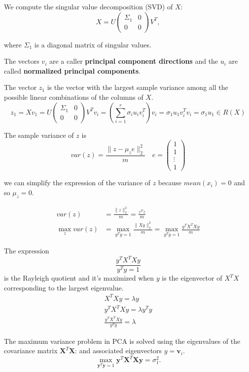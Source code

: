 We compute the singular value decomposition (SVD) of \( X \):
\[
X = U\begin{pmatrix}\Sigma_1 & 0 \\ 0 & 0\end{pmatrix} V^T,
\]

where \(\Sigma_1\) is a diagonal matrix of singular values.

The vectors \( v_i \) are a caller \textbf{principal component directions}
and the \( u_i \) are called \textbf{normalized principal components}.


The vector $z_1$ is the vector with the largest sample variance among all the possible linear combinations
of the columns of $X$.
\[
z_1 = Xv_1 = U\begin{pmatrix}
\Sigma_1 & 0 \\ 0 & 0
\end{pmatrix}V^T v_i = (\sum_{i=1}^{r}\sigma_i u_i v_i^T)v_i = \sigma_1 u_1 v_i^T v_i = \sigma_1 u_1 \in R(X)
\]

The sample variance of $z$ is
\[
var(z) = \frac{\|z - \mu_z e\|_2^2}{m} \quad e = \begin{pmatrix} 1 \\ 1 \\ \vdots \\ 1 \end{pmatrix}
\]

we can simplify the expression of the variance of $z$ because $mean(x_i) = 0$ and so $\mu_z = 0$.

\begin{align}
    var(z) &= \frac{\|z\|_2^2}{m} = \frac{z^T z}{m} \\
    \max_{z} var(z) &= \max_{y^T y = 1} \frac{\|Xy\|_2^2}{m} = \max_{y^T y = 1} \frac{y^T X^T X y}{m}
\end{align}

The expression
$$\frac{y^T X^T X y}{y^T y = 1}$$ is the Rayleigh quotient and it's maximized when $y$ is the eigenvector of $X^T X$ corresponding to the largest eigenvalue.
\begin{align}
    X^TXy = \lambda y \\
    y^TX^TXy = \lambda y^T y \\
    \frac{y^T X^T X y}{y^T y} = \lambda
\end{align}

The maximum variance problem in PCA is solved using the eigenvalues of the covariance matrix \( \mathbf{X}^T\mathbf{X} \):
and associated eigenvectors \( y = \mathbf{v}_i \).
\[
\max_{\mathbf{y}^T\mathbf{y}=1} \mathbf{y}^T\mathbf{X}^T\mathbf{X}\mathbf{y} = \sigma_1^2.
\]

